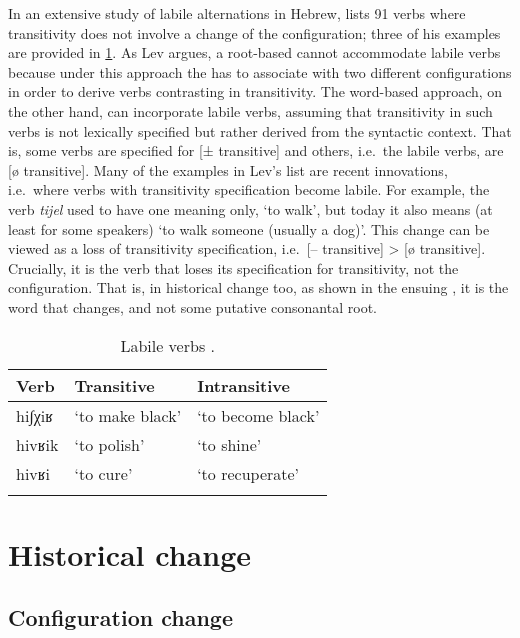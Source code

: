 \documentclass[output=paper,
modfonts
]{LSP/langsci}
\begin{document}
In an extensive study of labile alternations in Hebrew, \citet[114--115]{lev2016} lists
91 verbs where transitivity does not involve a change of the
configuration; three of his examples are provided in \cref{tab:labileverbs}.
As Lev argues, a root-based  cannot accommodate labile verbs
because under this approach the  has to associate with two different
configurations in order to derive verbs contrasting in transitivity. The
word-based approach, on the other hand, can incorporate labile verbs,
assuming that transitivity in such verbs is not lexically specified but
rather derived from the syntactic context. That is, some verbs are
specified for {[}± transitive{]} and others, i.e.\ the labile verbs, are
{[}ø transitive{]}. Many of the examples in Lev's list are recent
innovations, i.e.\ where verbs with transitivity specification become
labile. For example, the verb \emph{tijel} used to have one meaning
only, `to walk', but today it also means (at least for some speakers)
`to walk someone (usually a dog)'. This change can be viewed as a loss
of transitivity specification, i.e.\ {[}-- transitive{]} \textgreater
{[}ø transitive{]}. Crucially, it is the verb that loses its
specification for transitivity, not the configuration. That is, in
historical change too, as shown in the ensuing , it is the word that
changes, and not some putative consonantal root.

\begin{table}
	\begin{tabular}{lll}
		\lsptoprule
		Verb & Transitive & Intransitive\\
		\midrule
		hi∫χiʁ  & `to make black' & `to become black'\\
		hivʁik & `to polish' & `to shine'\\
		hivʁi & `to cure' & `to recuperate'\\
		\lspbottomrule
	\end{tabular}
	\caption{Labile verbs \citep[114--115]{lev2016}.}
	\label{tab:labileverbs}
\end{table}

\section{Historical change}\label{historical-change}\label{sec:batel:4}
\subsection{Configuration change}\label{configuration-change}
\end{document}
